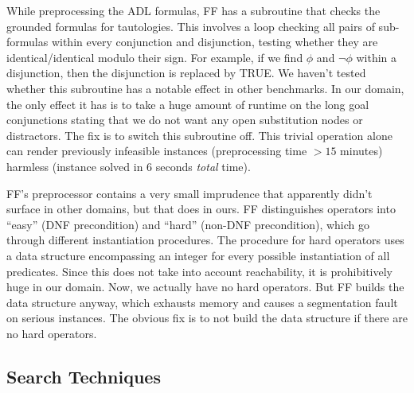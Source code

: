 While preprocessing the ADL formulas, FF has a subroutine that
checks the grounded formulas
for tautologies. This involves a loop checking all pairs of
sub-formulas within every conjunction and disjunction, testing whether
they are identical/identical modulo their sign. For example, if we
find $\phi$ and $\neg \phi$ within a disjunction, then the disjunction
is replaced by TRUE. We haven't tested whether this subroutine has a
notable effect in other benchmarks. In our domain, the only effect it
has is to take a huge amount of runtime on the long goal conjunctions
stating that we do not want any open substitution nodes or
distractors. The fix is to switch this subroutine off. This trivial
operation alone can render previously infeasible instances
(preprocessing time $>15$ minutes) harmless (instance solved in $6$
seconds {\em total} time).



FF's preprocessor contains a very small imprudence that apparently
didn't surface in other domains, but that does in ours. FF
distinguishes operators into ``easy'' (DNF precondition) and ``hard''
(non-DNF precondition), which go through different instantiation
procedures. The procedure for hard operators uses a data structure
encompassing an integer for every possible instantiation of all
predicates. Since this does not take into account reachability, it is
prohibitively huge in our domain. Now, we actually have no hard
operators. But FF builds the data structure anyway, which exhausts
memory and causes a segmentation fault on serious instances. The
obvious fix is to not build the data structure if there are no hard
operators.





















\subsection{Search Techniques}
\label{sec:crisp-ff:preprocess:heuristics}





